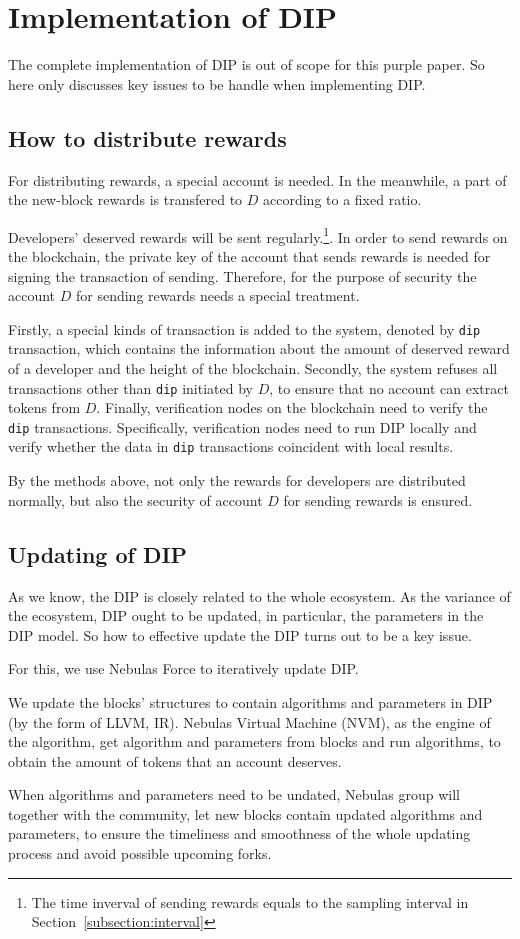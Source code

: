 \section{Implementation of DIP}
The complete implementation of DIP is out of scope for this purple paper. So here only discusses key issues to be handle when implementing DIP.

\subsection{How to distribute rewards}
For distributing rewards, a special account is needed. In the meanwhile, a part of the new-block rewards is transfered to $D$ according to a fixed ratio.

Developers' deserved rewards will be sent regularly.\footnote{The time inverval of sending rewards equals to the sampling interval in Section~\ref{subsection:interval}}. In order to send rewards on the blockchain, the private key of the account that sends rewards is needed for signing the transaction of sending. Therefore, for the purpose of security the account $D$ for sending rewards needs a special treatment.

Firstly, a special kinds of transaction is added to the system, denoted by \texttt{dip} transaction, which contains the information about the amount of deserved reward of a developer and the height of the blockchain. Secondly, the system refuses all transactions other than \texttt{dip} initiated by $D$, to ensure that no account can extract tokens from $D$. Finally, verification nodes on the blockchain  need to verify the \texttt{dip} transactions. Specifically, verification nodes need to run DIP locally and verify whether the data in \texttt{dip} transactions coincident with local results.

By the methods above, not only the rewards for developers are distributed normally, but also the security of account $D$ for sending rewards is ensured. 

\subsection{Updating of DIP}
As we know, the DIP is closely related to the whole ecosystem. As the variance of the ecosystem, DIP ought to be updated, in particular, the parameters in the DIP model. So how to effective update the DIP turns out to be a key issue.

For this, we use Nebulas Force to iteratively update DIP.

We update the blocks' structures to contain algorithms and parameters in DIP (by the form of LLVM, IR). Nebulas Virtual Machine (NVM), as the engine of the algorithm, get algorithm and parameters from blocks and run algorithms, to obtain the amount of tokens that an account deserves.

When algorithms and parameters need to be undated, Nebulas group will together with the community, let new blocks contain updated algorithms and parameters, to ensure the timeliness and smoothness of the whole updating process and avoid possible upcoming forks.

